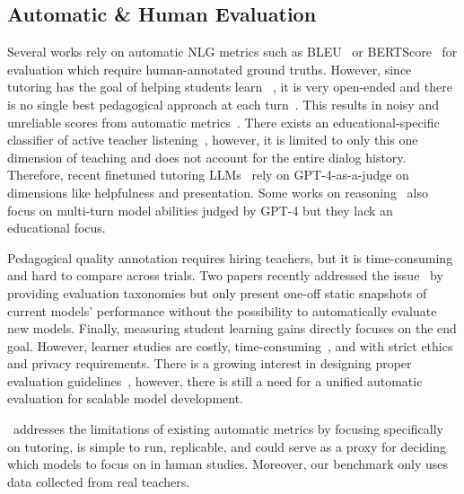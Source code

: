 \subsection{Automatic \& Human Evaluation}
Several works rely on automatic NLG metrics %
such as BLEU~\cite{papineni2002bleu} or BERTScore~\cite{Zhang2020BERTScore} for evaluation which require human-annotated ground truths. However, since tutoring has the goal of helping students learn %
~\cite{opportunities2023}, it is %
very open-ended and there is no single best pedagogical approach at each turn~\cite{jurenka2024towards}. This results in noisy and unreliable scores from automatic metrics~\cite{beasharedtask2023}. There exists an educational-specific classifier of active teacher listening~\cite{uptake2021}, however, it is limited to only this one dimension of teaching and does not account for the entire dialog history.
Therefore, recent finetuned tutoring LLMs~\cite{tutorchat24,socraticlm2024} rely on GPT-4-as-a-judge on dimensions like helpfulness and presentation. Some works on reasoning~\cite{mathchat2024} also focus on multi-turn model abilities judged by GPT-4 but they lack an educational focus. %


Pedagogical quality annotation requires hiring teachers, but it is time-consuming and hard to compare across trials. Two papers recently addressed the issue~\cite{tack2022ai,mrbench2024} by providing evaluation taxonomies but only present one-off static snapshots of current models' performance without the possibility to automatically evaluate new models. 
Finally, measuring student learning gains directly focuses on the end goal. However, learner studies are costly, time-consuming~\cite{schmucker2024ruffle}, and with strict ethics and privacy requirements. There is a growing interest in designing proper evaluation guidelines~\cite{beasharedtask2023,jurenka2024towards}, however, there is still a need for a unified automatic evaluation for scalable model development. 

\mathtutorbench\ addresses the limitations of existing automatic metrics by focusing specifically on tutoring, is simple to run, replicable, and could serve as a proxy for deciding which models to focus on in human studies. Moreover, our benchmark only uses data collected from real teachers.




